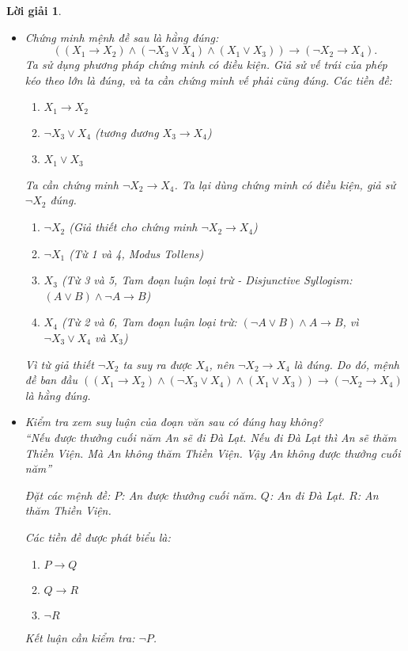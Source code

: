 \documentclass[11pt, oneside, a4paper]{article}
\newtheorem{loigiai}{Lời giải}[bt]
\begin{document}
    \begin{loigiai}
    \begin{itemize}
        \item[a)] Chứng minh mệnh đề sau là hằng đúng: 
        $$((X_1 \rightarrow X_2) \land (\lnot X_3 \lor X_4) \land (X_1 \lor X_3)) \rightarrow (\lnot X_2 \rightarrow X_4).$$
        Ta sử dụng phương pháp chứng minh có điều kiện. Giả sử vế trái của phép kéo theo lớn là đúng, và ta cần chứng minh vế phải cũng đúng.
        Các tiền đề:
        \begin{enumerate}
            \item $X_1 \rightarrow X_2$
            \item $\lnot X_3 \lor X_4$ (tương đương $X_3 \rightarrow X_4$)
            \item $X_1 \lor X_3$
        \end{enumerate}
        Ta cần chứng minh $\lnot X_2 \rightarrow X_4$. Ta lại dùng chứng minh có điều kiện, giả sử $\lnot X_2$ đúng.
        \begin{enumerate}
            \item[4.] $\lnot X_2$ (Giả thiết cho chứng minh $\lnot X_2 \rightarrow X_4$)
            \item[5.] $\lnot X_1$ (Từ 1 và 4, Modus Tollens)
            \item[6.] $X_3$ (Từ 3 và 5, Tam đoạn luận loại trừ - Disjunctive Syllogism: $(A \lor B) \land \lnot A \rightarrow B$)
            \item[7.] $X_4$ (Từ 2 và 6, Tam đoạn luận loại trừ: $(\lnot A \lor B) \land A \rightarrow B$, vì $\lnot X_3 \lor X_4$ và $X_3$)
        \end{enumerate}
        Vì từ giả thiết $\lnot X_2$ ta suy ra được $X_4$, nên $\lnot X_2 \rightarrow X_4$ là đúng.
        Do đó, mệnh đề ban đầu $((X_1 \rightarrow X_2) \land (\lnot X_3 \lor X_4) \land (X_1 \lor X_3)) \rightarrow (\lnot X_2 \rightarrow X_4)$ là hằng đúng.
    
        \item[b)] Kiểm tra xem suy luận của đoạn văn sau có đúng hay không?\\
        ``Nếu được thưởng cuối năm An sẽ đi Đà Lạt. Nếu đi Đà Lạt thì An sẽ thăm Thiền Viện. Mà An không thăm Thiền Viện. Vậy An không được thưởng cuối năm''
        
        Đặt các mệnh đề:
        $P$: An được thưởng cuối năm.
        $Q$: An đi Đà Lạt.
        $R$: An thăm Thiền Viện.
    
        Các tiền đề được phát biểu là:
        \begin{enumerate}
            \item $P \rightarrow Q$
            \item $Q \rightarrow R$
            \item $\lnot R$
        \end{enumerate}
        Kết luận cần kiểm tra: $\lnot P$.
    

\end{itemize}
\end{loigiai}
\end{document}
